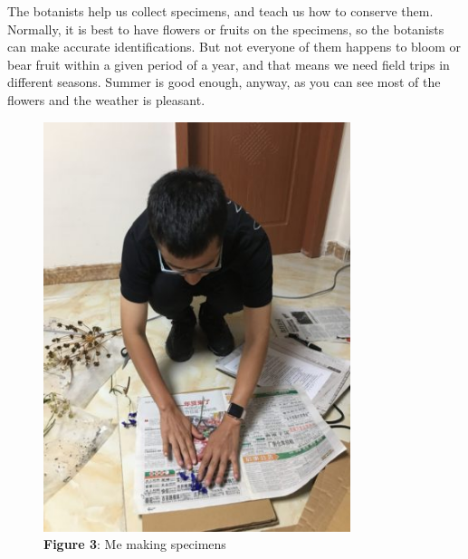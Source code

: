 \documentclass[
  a4paper,
  14pt,
  oneside,
  tablecaptionabove
]{scrbook}
\begin{document}
The botanists help us collect specimens, and teach us how to conserve
them. Normally, it is best to have flowers or fruits on the specimens,
so the botanists can make accurate identifications. But not everyone of
them happens to bloom or bear fruit within a given period of a year, and
that means we need field trips in different seasons. Summer is good
enough, anyway, as you can see most of the flowers and the weather is
pleasant.

\begin{figure}[h!]
\centering
\includegraphics[width=0.8\textwidth]{images/IMG_7423-e1575732106557-375x500.jpg}
\captionsetup{labelformat=empty}
\caption{\textbf{Figure 3}: Me making specimens}
\end{figure}
\end{document}
